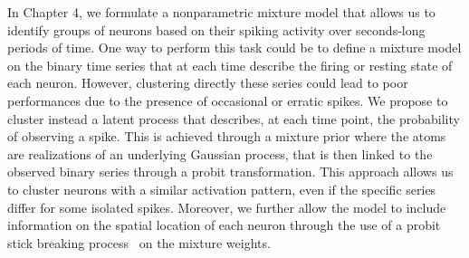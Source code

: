 In Chapter 4, we formulate a nonparametric mixture model that allows us to identify groups of neurons based on their 
spiking activity over seconds-long periods of time. One way to perform this task could be to define a mixture model on the binary time series that at each time describe the firing or resting state of each neuron.
However, clustering directly these series could lead to poor performances due to the presence of occasional or erratic spikes.
We propose to cluster instead a latent process that describes, at each time point, the probability of observing a spike. This is achieved through a mixture prior where the atoms are realizations of an underlying Gaussian process, that is then linked to the observed binary series through a probit transformation.
This approach allows us to cluster neurons with a similar activation pattern, even if the specific series differ for some isolated spikes.
Moreover, we further allow the model to include information on the spatial location of each neuron through the use of a probit stick breaking process~\parencite{rodriguez2011} on the mixture weights.












